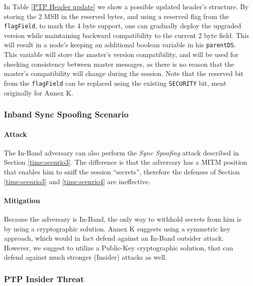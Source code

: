 \documentclass[11pt]{article}
\begin{document}
In Table \ref{PTP Header update} we show a possible updated header's structure. By storing the 2 MSB in the reserved bytes, and using a reserved flag from the \texttt{flagField}, to mark the 4 byte support, one can gradually deploy the upgraded version while maintaining backward compatibility to the current 2 byte field. This will result in a node's keeping an additional boolean variable in his \texttt{parentDS}. This variable will store the master's version compatibility, and will be used for checking consistency between master messages, as there is no reason that the master's compatibility will change during the session. Note that the reserved bit from the \texttt{flagField} can be replaced using the existing \texttt{SECURITY} bit, ment originally for Annex K.



\subsubsection{Inband Sync Spoofing Scenario}\label{time:scenrio5}

\paragraph{Attack}

The In-Band adversary can also perform the \emph{Sync Spoofing} attack described in Section \ref{time:scenrio3}. The difference is that the adversary has a MITM position that enables him to sniff the session ``secrets'', therefore the defenses of Section \ref{time:scenrio3} and \ref{time:scenrio4} are ineffective.



\paragraph{Mitigation}\label{time:scenrio5mit}

Because the adversary is In-Band, the only way to withhold secrets from him is by using a cryptographic solution. Annex K suggests using a symmetric key approach, which would in fact defend against an In-Band outsider attack. However, we suggest to utilize a Public-Key cryptographic solution, that can defend against much stronger (Insider) attacks as well.



\subsubsection{PTP Insider Threat}\label{time:scenrio6}
\end{document}
